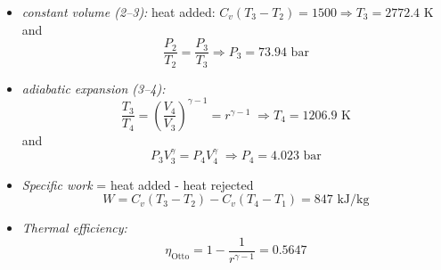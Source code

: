 \documentclass[12pts,a4paper,amsmath,amssymb,floatfix]{article}%
\newcommand{\frc}{\displaystyle\frac}
\begin{document}
\begin{enumerate}[label=\bfseries Example \arabic*]
\begin{itemize}
\item {\it constant volume (2--3):} heat added: $C_{v}\left(T_{3}-T_{2}\right)=1500\Longrightarrow T_{3}=2772.4\text{ K}$ and 
\begin{displaymath}
\frc{P_{2}}{T_{2}}=\frc{P_{3}}{T_{3}}\Longrightarrow P_{3}=73.94\text{ bar}
\end{displaymath}

\item {\it adiabatic expansion (3--4):}
\begin{displaymath}
\frc{T_{3}}{T_{4}}=\left(\frc{V_{4}}{V_{3}}\right)^{\gamma-1}=r^{\gamma-1}\;\Longrightarrow T_{4}=1206.9\text{ K}
\end{displaymath}
and
\begin{displaymath}
P_{3}V_{3}^{\gamma}=P_{4}V_{4}^{\gamma}\;\Longrightarrow P_{4}=4.023\text{ bar}
\end{displaymath}

\item {\it Specific work} = heat added - heat rejected
\begin{displaymath}
W= C_{v}\left(T_{3}-T_{2}\right)-C_{v}\left(T_{4}-T_{1}\right)=847\text{ kJ/kg}
\end{displaymath}

\item {\it Thermal efficiency:}
\begin{displaymath}
\eta_{\text{Otto}}=1- \frc{1}{r^{\gamma-1}} = 0.5647
\end{displaymath}
%
\end{itemize}


\end{enumerate}

\clearpage
\end{document}
